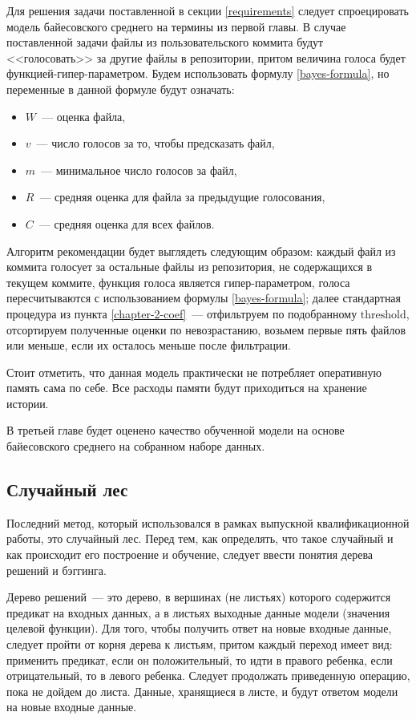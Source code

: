 Для решения задачи поставленной в секции \ref{requirements} следует спроецировать модель байесовского среднего на термины из первой главы. В случае поставленной задачи файлы из пользовательского коммита будут <<голосовать>> за другие файлы в репозитории, притом величина голоса будет функцией-гипер-параметром. Будем использовать формулу \ref{bayes-formula}, но переменные в данной формуле будут означать:
\begin{itemize}
    \item $W$~--- оценка файла,
    \item $v$~--- число голосов за то, чтобы предсказать файл,
    \item $m$~--- минимальное число голосов за файл,
    \item $R$~--- средняя оценка для файла за предыдущие голосования,
    \item ${C}$~--- средняя оценка для всех файлов.
\end{itemize}

Алгоритм рекомендации будет выглядеть следующим образом: каждый файл из коммита голосует за остальные файлы из репозитория, не содержащихся в текущем коммите, функция голоса является гипер-параметром, голоса пересчитываются с использованием формулы \ref{bayes-formula}; далее стандартная процедура из пункта \ref{chapter-2-coef}~--- отфильтруем по подобранному $\text{threshold}$, отсортируем полученные оценки по невозрастанию, возьмем первые пять файлов или меньше, если их осталось меньше после фильтрации.

Стоит отметить, что данная модель практически не потребляет оперативную память сама по себе. Все расходы памяти будут приходиться на хранение истории.

В третьей главе будет оценено качество обученной модели на основе байесовского среднего на собранном наборе данных.
    \subsection{Случайный лес}\label{chapter2-forest}
Последний метод, который использовался в рамках выпускной квалификационной работы, это случайный лес. Перед тем, как определять, что такое случайный и как происходит его построение и обучение, следует ввести понятия дерева решений и бэггинга.

Дерево решений~--- это дерево, в вершинах (не листьях) которого содержится предикат на входных данных, а в листьях выходные данные модели (значения целевой функции). Для того, чтобы получить ответ на новые входные данные, следует пройти от корня дерева к листьям, притом каждый переход имеет вид: применить предикат, если он положительный, то идти в правого ребенка, если отрицательный, то в левого ребенка. Следует продолжать приведенную операцию, пока не дойдем до листа. Данные, хранящиеся в листе, и будут ответом модели на новые входные данные.

